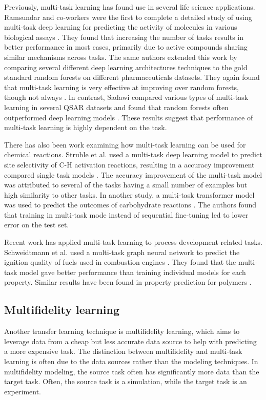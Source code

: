 Previously, multi-task learning has found use in several life science applications. Ramsundar and co-workers were the first to complete a detailed study of using multi-task deep learning for predicting the activity of molecules in various biological assays \cite{Ramsundar2015}. They found that increasing the number of tasks results in better performance in most cases, primarily due to active compounds sharing similar mechanisms across tasks. The same authors extended this work by comparing several different deep learning architectures techniques to the gold standard random forests on different pharmaceuticals datasets. They again found that multi-task learning is very effective at improving over random forests, though not always \cite{Ramsundar2017}. In contrast, Sadawi compared various types of multi-task learning in several QSAR datasets and found that random forests often outperformed deep learning models \cite{Sadawi2019}. These results suggest that performance of multi-task learning is highly dependent on the task.

There has also been work examining how multi-task learning can be used for chemical reactions. Struble et al. used a multi-task deep learning model to predict site selectivity of C-H activation reactions, resulting in a accuracy improvement compared single task models \cite{Struble2020}. The accuracy improvement of the multi-task model was attributed to several of the tasks having a small number of examples but high similarity to other tasks. In another study, a multi-task transformer model was used to predict the outcomes of carbohydrate reactions \cite{Pesciullesi2020}. The authors found that training in multi-task mode instead of sequential fine-tuning led to lower error on the test set. 

Recent work has applied multi-task learning to process development related tasks. Schweidtmann et al. used a multi-task graph neural network to predict the ignition quality of fuels used in combustion engines \cite{Schweidtmann2020}. They found that the multi-task model gave better performance than training individual models for each property. Similar results have been found in property prediction for polymers \cite{Gurnani2023}.

\subsection{Multifidelity learning}

Another transfer learning technique is multifidelity learning, which aims to leverage data from a cheap but less accurate data source to help with predicting a more expensive task. The distinction between multifidelity and multi-task learning is often due to the data sources rather than the modeling techniques. In multifidelity modeling, the source task often has significantly more data than the target task. Often, the source task is a simulation, while the target task is an experiment. 

